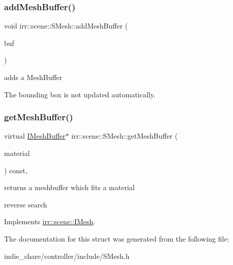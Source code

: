 \subsubsection{\texorpdfstring{add\+Mesh\+Buffer()}{addMeshBuffer()}}
{\footnotesize\ttfamily void irr\+::scene\+::\+S\+Mesh\+::add\+Mesh\+Buffer (\begin{DoxyParamCaption}\item[{\hyperlink{classirr_1_1scene_1_1IMeshBuffer}{I\+Mesh\+Buffer} $\ast$}]{buf }\end{DoxyParamCaption})\hspace{0.3cm}{\ttfamily [inline]}}



adds a Mesh\+Buffer 

The bounding box is not updated automatically. \mbox{\label{structirr_1_1scene_1_1SMesh_a768eeba9148e949d6962bee08517a056}} 
\subsubsection{\texorpdfstring{get\+Mesh\+Buffer()}{getMeshBuffer()}}
{\footnotesize\ttfamily virtual \hyperlink{classirr_1_1scene_1_1IMeshBuffer}{I\+Mesh\+Buffer}$\ast$ irr\+::scene\+::\+S\+Mesh\+::get\+Mesh\+Buffer (\begin{DoxyParamCaption}\item[{const \hyperlink{classirr_1_1video_1_1SMaterial}{video\+::\+S\+Material} \&}]{material }\end{DoxyParamCaption}) const\hspace{0.3cm}{\ttfamily [inline]}, {\ttfamily [virtual]}}



returns a meshbuffer which fits a material 

reverse search 

Implements \hyperlink{classirr_1_1scene_1_1IMesh_a9573dace82efb01ba1f35f9cc28a4ced}{irr\+::scene\+::\+I\+Mesh}.



The documentation for this struct was generated from the following file\+:\begin{DoxyCompactItemize}
\item 
indie\+\_\+share/controller/include/S\+Mesh.\+h\end{DoxyCompactItemize}
